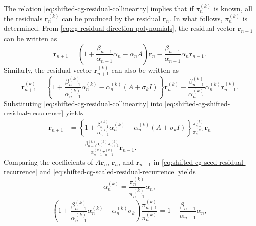 {The relation \eqref{eq:shifted-cg-residual-collinearity} implies that if $\pi_n^{(k)}$ is known, all the residuals $\bm r_n^{(k)}$ can be produced by the residual $\bm r_n$. In what follows, $\pi_n^{(k)}$ is determined.}
{From \eqref{eq:cg-residual-direction-polynomials}, the residual vector $\bm r_{n+1}$ can be written as}
\begin{equation}\label{eq:shifted-cg-seed-residual-recurrence}\bm r_{n+1}=\left(1+\frac{\beta_{n-1}}{\alpha_{n-1}}\alpha_n-\alpha_nA\right)\bm r_n-\frac{\beta_{n-1}}{\alpha_{n-1}}\alpha_n\bm r_{n-1}.\end{equation}
{Similarly, the residual vector $\bm r_{n+1}^{(k)}$ can also be written as}
\begin{equation}\label{eq:shifted-cg-shifted-residual-recurrence}\bm r_{n+1}^{(k)}=\left\{1+\frac{\beta_{n-1}^{(k)}}{\alpha_{n-1}^{(k)}}\alpha_n^{(k)}-\alpha_n^{(k)}(A+\sigma_k I)\right\}\bm r_n^{(k)}-\frac{\beta_{n-1}^{(k)}}{\alpha_{n-1}^{(k)}}\alpha_n^{(k)}\bm r_{n-1}^{(k)}.\end{equation}
{Substituting \eqref{eq:shifted-cg-residual-collinearity} into \eqref{eq:shifted-cg-shifted-residual-recurrence} yields}
\begin{equation}\label{eq:shifted-cg-scaled-residual-recurrence}\begin{aligned}\bm r_{n+1}&=\left\{1+\frac{\beta_{n-1}^{(k)}}{\alpha_{n-1}^{(k)}}\alpha_n^{(k)}-\alpha_n^{(k)}(A+\sigma_k I)\right\}\frac{\pi_{n+1}^{(k)}}{\pi_n^{(k)}}\bm r_n\\&\quad-\frac{\beta_{n-1}^{(k)}\alpha_n^{(k)}\pi_{n+1}^{(k)}}{\alpha_{n-1}^{(k)}\pi_{n-1}^{(k)}}\bm r_{n-1}.\end{aligned}\end{equation}
{Comparing the coefficients of $A\bm r_n$, $\bm r_n$, and $\bm r_{n-1}$ in \eqref{eq:shifted-cg-seed-residual-recurrence} and \eqref{eq:shifted-cg-scaled-residual-recurrence} yields}
\begin{equation}\label{eq:shifted-cg-alpha}\alpha_n^{(k)}=\frac{\pi_n^{(k)}}{\pi_{n+1}^{(k)}}\alpha_n,\end{equation}
\begin{equation}\label{eq:shifted-cg-middle-coefficient}\left(1+\frac{\beta_{n-1}^{(k)}}{\alpha_{n-1}^{(k)}}\alpha_n^{(k)}-\alpha_n^{(k)}\sigma_k\right)\frac{\pi_{n+1}^{(k)}}{\pi_n^{(k)}}=1+\frac{\beta_{n-1}}{\alpha_{n-1}}\alpha_n,\end{equation}
